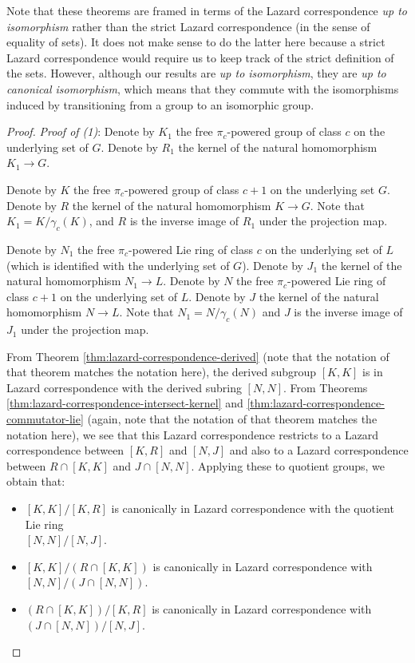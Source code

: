 Note that these theorems are framed in terms of the Lazard
correspondence {\em up to isomorphism} rather than the strict Lazard
correspondence (in the sense of equality of sets). It does not make
sense to do the latter here because a strict Lazard correspondence
would require us to keep track of the strict definition of the
sets. However, although our results are {\em up to isomorphism}, they
are {\em up to canonical isomorphism}, which means that they commute
with the isomorphisms induced by transitioning from a group to an
isomorphic group.

\begin{proof}
  {\em Proof of (1)}: Denote by $K_1$ the free $\pi_c$-powered group
  of class $c$ on the underlying set of $G$. Denote by $R_1$ the
  kernel of the natural homomorphism $K_1 \to G$.

  Denote by $K$ the free $\pi_c$-powered group of class $c + 1$ on the
  underlying set $G$. Denote by $R$ the kernel of the natural
  homomorphism $K \to G$. Note that $K_1 = K/\gamma_c(K)$, and $R$ is
  the inverse image of $R_1$ under the projection map.

  Denote by $N_1$ the free $\pi_c$-powered Lie ring of class $c$ on the
  underlying set of $L$ (which is identified with the underlying set
  of $G$). Denote by $J_1$ the kernel of the natural homomorphism $N_1
  \to L$. Denote by $N$ the free $\pi_c$-powered Lie ring of class $c +
  1$ on the underlying set of $L$. Denote by $J$ the kernel of the natural
  homomorphism $N \to L$. Note that $N_1 = N/\gamma_c(N)$ and $J$ is
  the inverse image of $J_1$ under the projection map.

  From Theorem \ref{thm:lazard-correspondence-derived} (note that the
  notation of that theorem matches the notation here), the derived
  subgroup $[K,K]$ is in Lazard correspondence with the derived
  subring $[N,N]$. From Theorems
  \ref{thm:lazard-correspondence-intersect-kernel} and
  \ref{thm:lazard-correspondence-commutator-lie} (again, note that the
  notation of that theorem matches the notation here), we see that
  this Lazard correspondence restricts to a Lazard correspondence
  between $[K,R]$ and $[N,J]$ and also to a Lazard correspondence
  between $R \cap [K,K]$ and $J \cap [N,N]$. Applying these to
  quotient groups, we obtain that:

  \begin{itemize}
  \item $[K,K]/[K,R]$ is canonically in Lazard correspondence with the
    quotient Lie ring \\ $[N,N]/[N,J]$.
  \item $[K,K]/(R \cap [K,K])$ is canonically in Lazard correspondence
    with $[N,N]/(J \cap [N,N])$. 
  \item $(R \cap [K,K])/[K,R]$ is canonically in Lazard correspondence
    with $(J \cap [N,N])/[N,J]$.
  \end{itemize}


\end{proof}
